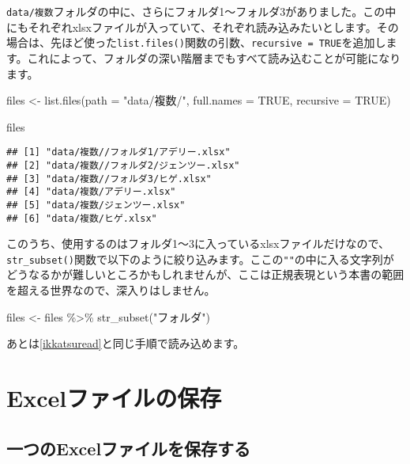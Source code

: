 \documentclass[
  xelatex,ja=standard, b5paper]{bxjsbook}
\newenvironment{Shaded}{\begin{snugshade}}{\end{snugshade}}
\newcommand{\AttributeTok}[1]{\textcolor[rgb]{0.77,0.63,0.00}{#1}}
\newcommand{\ConstantTok}[1]{\textcolor[rgb]{0.00,0.00,0.00}{#1}}
\newcommand{\FunctionTok}[1]{\textcolor[rgb]{0.00,0.00,0.00}{#1}}
\newcommand{\NormalTok}[1]{#1}
\newcommand{\OtherTok}[1]{\textcolor[rgb]{0.56,0.35,0.01}{#1}}
\newcommand{\SpecialCharTok}[1]{\textcolor[rgb]{0.00,0.00,0.00}{#1}}
\newcommand{\StringTok}[1]{\textcolor[rgb]{0.31,0.60,0.02}{#1}}
\begin{document}
\texttt{data/複数}フォルダの中に、さらにフォルダ1～フォルダ3がありました。この中にもそれぞれxlsxファイルが入っていて、それぞれ読み込みたいとします。その場合は、先ほど使った\texttt{list.files()}関数の引数、\texttt{recursive\ =\ TRUE}を追加します。これによって、フォルダの深い階層までもすべて読み込むことが可能になります。

\begin{Shaded}
\begin{Highlighting}[]
\NormalTok{files }\OtherTok{\textless{}{-}}
    \FunctionTok{list.files}\NormalTok{(}\AttributeTok{path =} \StringTok{"data/複数/"}\NormalTok{, }\AttributeTok{full.names =} \ConstantTok{TRUE}\NormalTok{, }\AttributeTok{recursive =} \ConstantTok{TRUE}\NormalTok{)}

\NormalTok{files}
\end{Highlighting}
\end{Shaded}

\begin{verbatim}
## [1] "data/複数//フォルダ1/アデリー.xlsx"  
## [2] "data/複数//フォルダ2/ジェンツー.xlsx"
## [3] "data/複数//フォルダ3/ヒゲ.xlsx"      
## [4] "data/複数/アデリー.xlsx"             
## [5] "data/複数/ジェンツー.xlsx"           
## [6] "data/複数/ヒゲ.xlsx"
\end{verbatim}

このうち、使用するのはフォルダ1～3に入っているxlsxファイルだけなので、\texttt{str\_subset()}関数で以下のように絞り込みます。ここの\texttt{""}の中に入る文字列がどうなるかが難しいところかもしれませんが、ここは正規表現という本書の範囲を超える世界なので、深入りはしません。

\begin{Shaded}
\begin{Highlighting}[]
\NormalTok{files }\OtherTok{\textless{}{-}} 
\NormalTok{  files }\SpecialCharTok{\%\textgreater{}\%} \FunctionTok{str\_subset}\NormalTok{(}\StringTok{"フォルダ"}\NormalTok{)}
\end{Highlighting}
\end{Shaded}

あとは\ref{ikkatsuread}と同じ手順で読み込めます。

\hypertarget{writeexcel}{%
\chapter{Excelファイルの保存}\label{writeexcel}}

\hypertarget{writeoneexcel}{%
\section{一つのExcelファイルを保存する}\label{writeoneexcel}}
\end{document}
